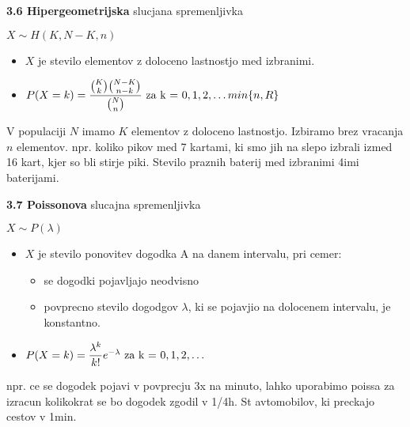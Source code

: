 \documentclass{article}
\begin{document}
\begin{multicols}{3}
\textbf{3.6 Hipergeometrijska} slucjana spremenljivka
\begin{center}
    \begin{math}
        X \sim H(K, N - K, n)
    \end{math}
\end{center}
\begin{itemize}
    \item $X$ je stevilo elementov z doloceno lastnostjo med izbranimi.
    \item \begin{math}
        P(X = k) =  \dfrac{ {K \choose k} {N - K \choose n - k} }{{N \choose n}} $ za k = $ 0,1,2,\dots min\{ n, R \}
    \end{math}
\end{itemize}
V populaciji $N$  imamo $K$ elementov  z doloceno lastnostjo. Izbiramo brez vracanja $n$ elementov.
npr. koliko pikov med 7 kartami, ki smo jih na slepo izbrali izmed 16 kart, kjer so bli stirje piki.
Stevilo praznih baterij med izbranimi 4imi baterijami.

\textbf{3.7 Poissonova} slucajna spremenljivka
\begin{center}
    \begin{math}
        X \sim P(\lambda)
    \end{math}
\end{center}
\begin{itemize}
    \item $X$ je stevilo ponovitev dogodka A na danem intervalu, pri cemer:
        \begin{itemize}
            \item se dogodki pojavljajo neodvisno
            \item povprecno stevilo dogodgov $\lambda$, ki se pojavjio na dolocenem intervalu, je konstantno.
        \end{itemize}
    \item \begin{math}
        P(X = k) =  \dfrac{ \lambda^{k} }{k!} e^{- \lambda}$ za k = $ 0,1,2,\dots
    \end{math}
\end{itemize}
npr. ce se dogodek pojavi v povprecju 3x na minuto, lahko uporabimo poissa za izracun
kolikokrat se bo dogodek zgodil v  1/4h. St avtomobilov, ki preckajo cestov v 1min.

\smallskip
\end{multicols}
\end{document}
